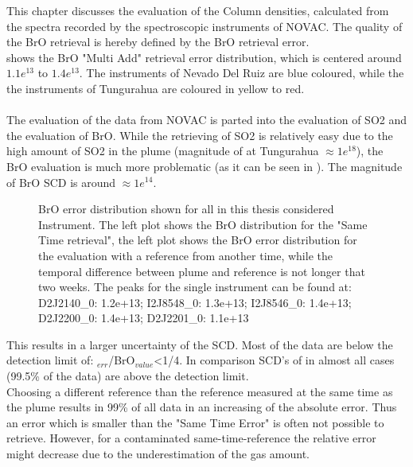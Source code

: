 This chapter discusses the evaluation of the  Column densities, calculated from the spectra recorded by the spectroscopic instruments of NOVAC. The quality of the BrO retrieval is hereby defined by the BrO retrieval error.\\
 shows the BrO "Multi Add" retrieval error distribution, which is centered around $1.1e^{13}$ to $1.4e^{13}$. The instruments of Nevado Del Ruiz are blue  coloured, while the the instruments of Tungurahua are coloured in yellow to red.\\
\\
The evaluation of the data from NOVAC is parted into the evaluation of SO2 and the evaluation of BrO. While the retrieving of SO2 is relatively easy due to the high amount of SO2 in the plume (magnitude of  at Tungurahua $\approx 1e^{18}$), the BrO evaluation is much more problematic (as it can be seen in ). The magnitude of BrO SCD is around $\approx 1e^{14}$. \\
%
\begin{figure}
	\caption{BrO error distribution shown for all in this thesis considered Instrument. The left plot shows the BrO distribution for the "Same Time retrieval", the left plot shows the BrO error distribution for the evaluation with a reference from another time, while the temporal difference between plume and reference is not longer that two weeks. 
	The peaks for the single instrument can be found at: D2J2140\_0: 1.2e+13;
		 I2J8548\_0: 1.3e+13;
		I2J8546\_0: 1.4e+13;
		D2J2200\_0: 1.4e+13;
		D2J2201\_0: 1.1e+13}
	\label{fig:allbroerrordistribution}
\end{figure}
%
This results in a larger uncertainty of the   SCD. Most of the   data are below the detection limit of: $_{err}$/BrO$_{value}$<1/4. In comparison SCD's of  in almost all cases (99.5\% of the data)  are above the detection limit. \\
%
Choosing a different reference than the reference measured at the same time as the plume results in 99\% of all data in an increasing of the absolute error. 
Thus an  error which is smaller than the "Same Time Error" is often not  possible to retrieve. 
However, for a contaminated same-time-reference the relative error might decrease due to the underestimation of the gas amount. \\
